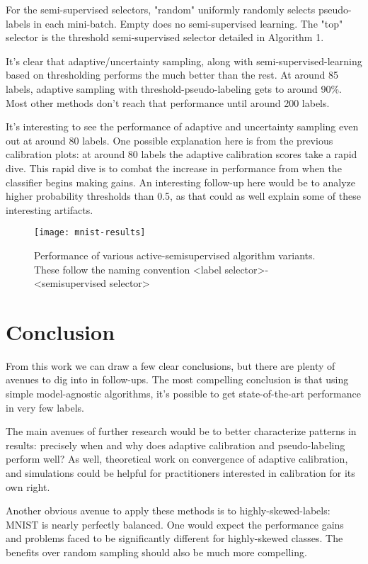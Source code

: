 \documentclass{article}
\begin{document}
For the semi-supervised selectors, "random" uniformly randomly selects pseudo-labels in each mini-batch.  Empty does no semi-supervised learning.  The "top" selector is the threshold semi-supervised selector detailed in Algorithm 1.  

It's clear that adaptive/uncertainty sampling, along with semi-supervised-learning based on thresholding performs the much better than the rest.  At around 85 labels, adaptive sampling with threshold-pseudo-labeling gets to around 90\%.  Most other methods don't reach that performance until around 200 labels.  

It's interesting to see the performance of adaptive and uncertainty sampling even out at around 80 labels.  One possible explanation here is from the previous calibration plots: at around 80 labels the adaptive calibration scores take a rapid dive.  This rapid dive is to combat the increase in performance from when the classifier begins making gains.  An interesting follow-up here would be to analyze higher probability thresholds than 0.5, as that could as well explain some of these interesting artifacts.  



\begin{figure}[h]
  \center 
  \texttt{[image: mnist-results]}
  \caption{Performance of various active-semisupervised algorithm variants.  These follow the naming convention <label selector>-<semisupervised selector>}
\end{figure}

\section{Conclusion}
From this work we can draw a few clear conclusions, but there are plenty of avenues to dig into in follow-ups.  The most compelling conclusion is that using simple model-agnostic algorithms, it's possible to get state-of-the-art performance in very few labels.  

The main avenues of further research would be to better characterize patterns in results: precisely when and why does adaptive calibration and pseudo-labeling perform well?  As well, theoretical work on convergence of adaptive calibration, and simulations could be helpful for practitioners interested in calibration for its own right.

Another obvious avenue to apply these methods is to highly-skewed-labels: MNIST is nearly perfectly balanced.  One would expect the performance gains and problems faced to be significantly different for highly-skewed classes.  The benefits over random sampling should also be much more compelling.  
\end{document}
